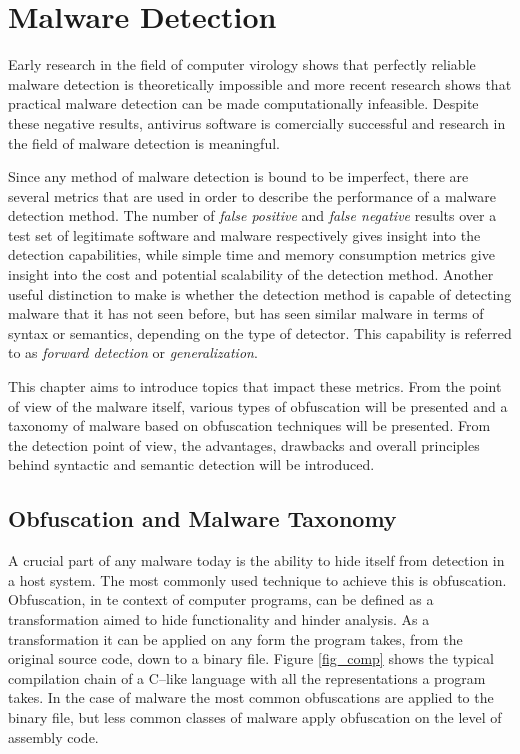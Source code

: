 \chapter{Malware Detection}
\label{ch_malware}
Early research in the field of computer virology shows that perfectly reliable malware detection is theoretically impossible\cite{Cohen86} and more recent research shows that practical malware detection can be made computationally infeasible\cite{Filiol12}. Despite these negative results, antivirus software is comercially successful and research in the field of malware detection is meaningful.

Since any method of malware detection is bound to be imperfect, there are several metrics that are used in order to describe the performance of a malware detection method. The number of \emph{false positive} and \emph{false negative} results over a test set of legitimate software and malware respectively gives insight into the detection capabilities, while simple time and memory consumption metrics give insight into the cost and potential scalability of the detection method. Another useful distinction to make is whether the detection method is capable of detecting malware that it has not seen before, but has seen similar malware in terms of syntax or semantics, depending on the type of detector. This capability is referred to as \emph{forward detection}\cite{Christo07} or \emph{generalization}\cite{Babic11}.

This chapter aims to introduce topics that impact these metrics. From the point of view of the malware itself, various types of obfuscation will be presented and a taxonomy of malware based on obfuscation techniques will be presented. From the detection point of view, the advantages, drawbacks and overall principles behind syntactic and semantic detection will be introduced.

\section{Obfuscation and Malware Taxonomy}
A crucial part of any malware today is the ability to hide itself from detection in a host system. The most commonly used technique to achieve this is obfuscation. Obfuscation, in te context of computer programs, can be defined as a transformation aimed to hide functionality and hinder analysis. As a transformation it can be applied on any form the program takes, from the original source code, down to a binary file. Figure \ref{fig_comp} shows the typical compilation chain of a C--like language with all the representations a program takes. In the case of malware the most common obfuscations are applied to the binary file, but less common classes of malware apply obfuscation on the level of assembly code.

